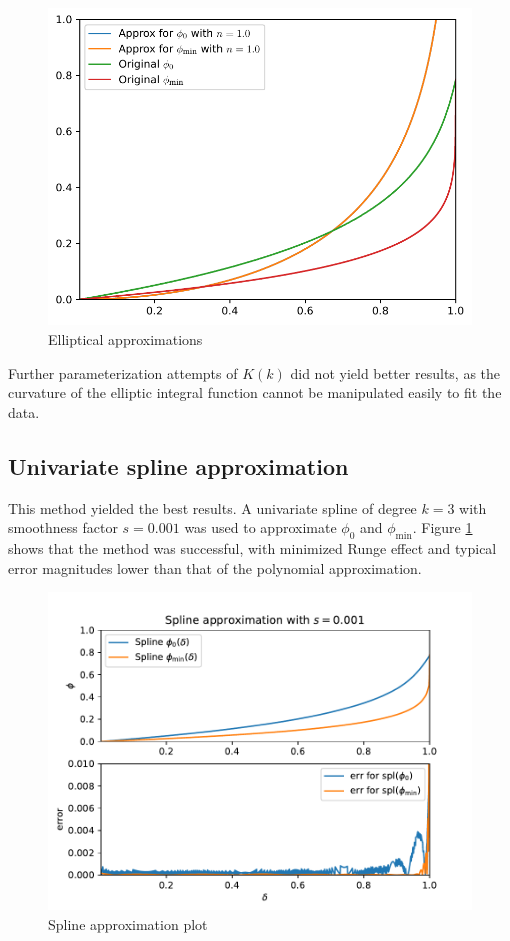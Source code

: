 \begin{figure}[H]
    \centering
    \includegraphics[scale=0.75]{plots/elliptical-approx.pdf}
    \caption{Elliptical approximations}
\end{figure}

Further parameterization attempts of $K(k)$ did not yield better results, as the curvature of the elliptic integral function cannot be manipulated easily to fit the data.

\subsection{Univariate spline approximation}

This method yielded the best results. A univariate spline of degree $k=3$ with smoothness factor $s=0.001$ was used to approximate $\phi_0$ and $\phi_\mathrm{min}$.
Figure \ref{splineplot} shows that the method was successful, with minimized Runge effect and typical error magnitudes lower than that of the polynomial approximation.

\begin{figure}[H]
    \centering
    \includegraphics[]{plots/spline.pdf}
    \caption{Spline approximation plot}\label{splineplot}
\end{figure}


